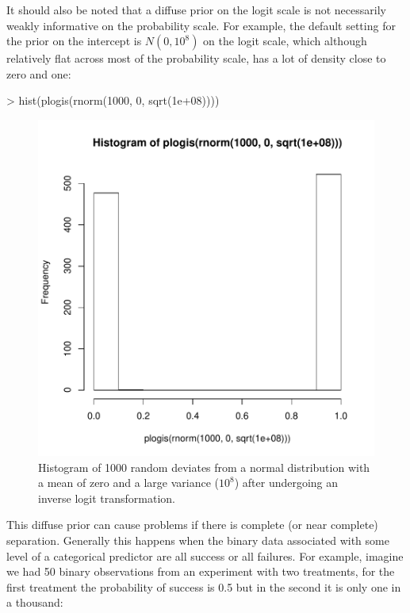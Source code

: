 \documentclass{article}
\begin{document}
It should also be noted that a diffuse prior on the logit scale is not necessarily weakly informative on the probability scale. For example, the default setting for the prior on the intercept is $N(0, 10^{8})$ on the logit scale, which although relatively flat across most of the probability scale, has a lot of density close to zero and one:


\begin{Schunk}
\begin{Sinput}
> hist(plogis(rnorm(1000, 0, sqrt(1e+08))))
\end{Sinput}
\end{Schunk}

\begin{figure}[!h]
\begin{center}
\includegraphics{Lecture2-074}
\end{center}
\caption{Histogram of 1000 random deviates from a normal distribution with a mean of zero and a large variance ($10^8$) after undergoing an inverse logit transformation.}
\label{invlogit-fig}
\end{figure}

This diffuse prior can cause problems if there is complete (or near complete) separation. Generally this happens when the binary data associated with some level of a categorical predictor are all success or all failures. For example, imagine we had 50 binary observations from an experiment with two treatments, for the first treatment the probability of success is 0.5 but in the second it is only one in a thousand:
\end{document}
